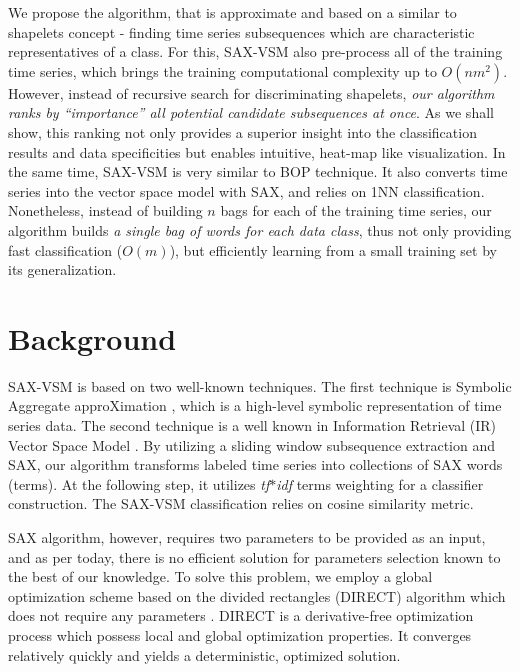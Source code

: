 \documentclass[conference]{IEEEtran}
\begin{document}
We propose the algorithm, that is approximate and based on a similar to shapelets concept - 
finding time series subsequences which are characteristic representatives of a class. 
For this, SAX-VSM also pre-process all of the training time series, which brings the training 
computational complexity up to $O(nm^{2})$.
However, instead of recursive search for discriminating shapelets, 
\textit{our algorithm ranks by ``importance'' all potential candidate subsequences at once}.
As we shall show, this ranking not only provides a superior insight into the classification 
results and data specificities but enables intuitive, heat-map like visualization. 
In the same time, SAX-VSM is very similar to BOP technique. It also converts time series into 
the vector space model with SAX, and relies on 1NN classification. Nonetheless, instead of 
building $n$ bags for each of the training time series, our algorithm builds \textit{a single 
bag of words for each data class}, thus not only providing fast classification ($O(m)$), 
but efficiently learning from a small training set by its generalization.

\section{Background} \label{background}
SAX-VSM is based on two well-known techniques. The first technique is 
Symbolic Aggregate approXimation \cite{sax}, which is a high-level symbolic  representation 
of time series data. The second technique is a well known in Information Retrieval (IR) 
Vector Space Model \cite{salton}. By utilizing a sliding window subsequence extraction and SAX, 
our algorithm transforms labeled time series into collections of SAX words (terms). 
At the following step, it utilizes \textit{tf$\ast$idf} terms weighting for a classifier construction. 
The SAX-VSM classification relies on cosine similarity metric.


SAX algorithm, however, requires two parameters to be provided as an input, and as per 
today, there is no efficient solution for parameters selection known to the best of our knowledge. 
To solve this problem, we employ a global optimization scheme based on the divided rectangles
(DIRECT) algorithm which does not require any parameters \cite{direct}. DIRECT is a derivative-free
optimization process which possess local and global optimization properties. It converges relatively
quickly and yields a deterministic, optimized solution.
\end{document}
